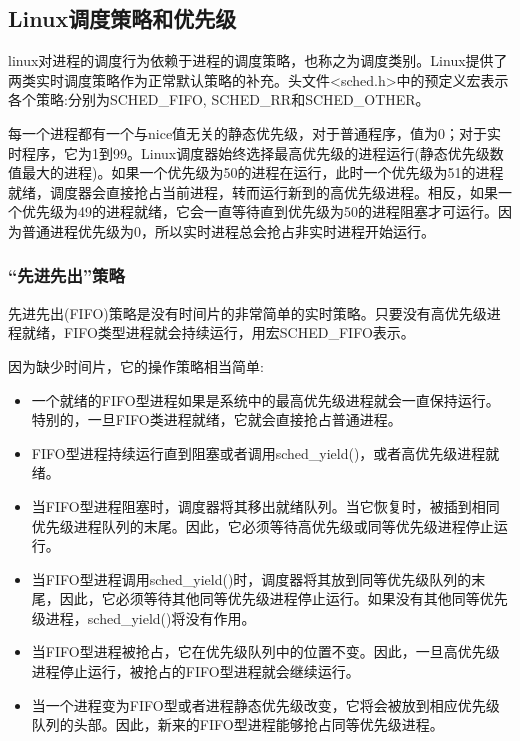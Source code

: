 \subsection{Linux调度策略和优先级}

  linux对进程的调度行为依赖于进程的调度策略，也称之为调度类别。Linux提供了两类实时调度策略作为正常默认策略的补充。头文件<sched.h>中的预定义宏表示各个策略:分别为SCHED\_FIFO, SCHED\_RR和SCHED\_OTHER。

  每一个进程都有一个与nice值无关的静态优先级，对于普通程序，值为0；对于实时程序，它为1到99。Linux调度器始终选择最高优先级的进程运行(静态优先级数值最大的进程)。如果一个优先级为50的进程在运行，此时一个优先级为51的进程就绪，调度器会直接抢占当前进程，转而运行新到的高优先级进程。相反，如果一个优先级为49的进程就绪，它会一直等待直到优先级为50的进程阻塞才可运行。因为普通进程优先级为0，所以实时进程总会抢占非实时进程开始运行。

\subsubsection{“先进先出”策略}

  先进先出(FIFO)策略是没有时间片的非常简单的实时策略。只要没有高优先级进程就绪，FIFO类型进程就会持续运行，用宏SCHED\_FIFO表示。

  因为缺少时间片，它的操作策略相当简单:

\begin{itemize}
\item \begin{flushleft}一个就绪的FIFO型进程如果是系统中的最高优先级进程就会一直保持运行。特别的，一旦FIFO类进程就绪，它就会直接抢占普通进程。\end{flushleft}
\item \begin{flushleft}FIFO型进程持续运行直到阻塞或者调用sched\_yield()，或者高优先级进程就绪。\end{flushleft}
\item \begin{flushleft}当FIFO型进程阻塞时，调度器将其移出就绪队列。当它恢复时，被插到相同优先级进程队列的末尾。因此，它必须等待高优先级或同等优先级进程停止运行。\end{flushleft}
\item \begin{flushleft}当FIFO型进程调用sched\_yield()时，调度器将其放到同等优先级队列的末尾，因此，它必须等待其他同等优先级进程停止运行。如果没有其他同等优先级进程，sched\_yield()将没有作用。\end{flushleft}
\item \begin{flushleft}当FIFO型进程被抢占，它在优先级队列中的位置不变。因此，一旦高优先级进程停止运行，被抢占的FIFO型进程就会继续运行。\end{flushleft}
\item \begin{flushleft}当一个进程变为FIFO型或者进程静态优先级改变，它将会被放到相应优先级队列的头部。因此，新来的FIFO型进程能够抢占同等优先级进程。\end{flushleft}
\end{itemize}

